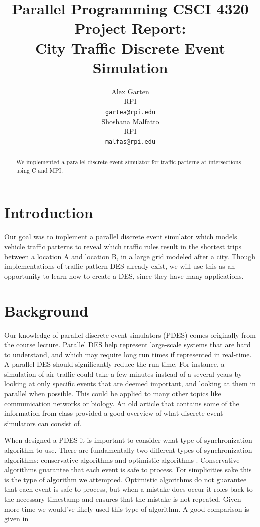 \documentclass[10pt,a4paper]{article}
\title{Parallel Programming CSCI 4320 Project Report: \\
City Traffic Discrete Event Simulation}
\author{Alex Garten \\
  RPI \\
  \texttt{gartea@rpi.edu} \\\And
  Shoshana Malfatto \\
  RPI \\
  \texttt{malfas@rpi.edu} \\}
\date{}
\begin{document}
\maketitle
\begin{abstract}
    We implemented a parallel discrete event simulator for traffic patterns at intersections using C and MPI.
\end{abstract}

\section{Introduction}

Our goal was to implement a parallel discrete event simulator which models vehicle traffic patterns to reveal which traffic rules result in the shortest trips between a location A and location B, in a large grid modeled after a city. Though implementations of traffic pattern DES already exist, we will use this as an opportunity to learn how to create a DES, since they have many applications.

\section{Background}
Our knowledge of parallel discrete event simulators (PDES) comes originally from the course lecture. Parallel DES help represent large-scale systems that are hard to understand, and which may require long run times if represented in real-time. A parallel DES should significantly reduce the run time. For instance, a simulation of air traffic could take a few minutes instead of a several years by looking at only specific events that are deemed important, and looking at them in parallel when possible. This could be applied to many other topics like communication networks or biology. An old article \cite{Fujimoto:1990:PDE:84537.84545} that contains some of the information from class provided a good overview of what discrete event simulators can consist of.

When designed a PDES it is important to consider what type of synchronization algorithm to use. There are fundamentally two different types of synchronization algorithms: conservative algorithms and optimistic algorithms \cite{Fujimoto:1993:PDD:256563.256596}. Conservative algorithms guarantee that each event is safe to process. For simplicities sake this is the type of algorithm we attempted. Optimistic algorithms do not guarantee that each event is safe to process, but when a mistake does occur it roles back to the necessary timestamp and ensures that the mistake is not repeated. Given more time we would've likely used this type of algorithm. A good comparison is given in \cite{Carothers:2010}
\end{document}
